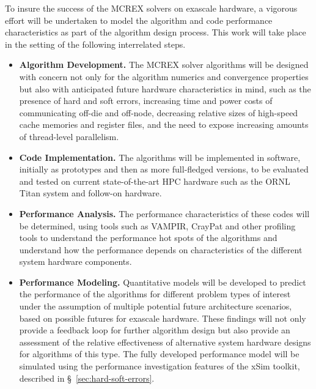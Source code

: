 To insure the success of the MCREX solvers on exascale hardware, a vigorous
effort will be undertaken to model the algorithm and code performance
characteristics as part of the algorithm design process.  This work will take
place in the setting of the following interrelated steps.

\begin{itemize}
  \parskip = -2pt
\item {\bf Algorithm Development.}  The MCREX solver algorithms will be
  designed with concern not only for the algorithm numerics and convergence
  properties but also with anticipated future hardware characteristics in
  mind, such as the presence of hard and soft errors, increasing time and
  power costs of communicating off-die and off-node, decreasing relative sizes of
  high-speed cache memories and register files, and the need to expose
  increasing amounts of thread-level parallelism.

\item {\bf Code Implementation.} The algorithms will be implemented in software,
  initially as prototypes and then as more full-fledged versions, to be
  evaluated and tested on current state-of-the-art HPC hardware such as the
  ORNL Titan system and follow-on hardware.

\item {\bf Performance Analysis.}  The performance characteristics of these
  codes will be determined, using tools such as VAMPIR, CrayPat and other
  profiling tools to understand the performance hot spots of the algorithms
  and understand how the performance depends on characteristics of the
  different system hardware components.

\item {\bf Performance Modeling.}  Quantitative models will be developed to
  predict the performance of the algorithms for different problem types of
  interest under the assumption of multiple potential future architecture
  scenarios, based on possible futures for exascale hardware.  These findings
  will not only provide a feedback loop for further algorithm design but also
  provide an assessment of the relative effectiveness of alternative system
  hardware designs for algorithms of this type. The fully developed
  performance model will be simulated using the performance investigation
  features of the xSim toolkit, described
  in \S~\ref{sec:hard-soft-errors}.

\end{itemize}

